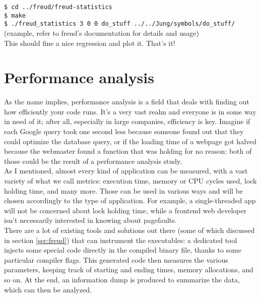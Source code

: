         \texttt{\$ cd ../freud/freud-statistics}\\

        \texttt{\$ make}\\

        \texttt{\$ ./freud\_statistics 3 0 0 do\_stuff ../../Jung/symbols/do\_stuff/}
        (example, refer to freud's documentation for details and usage)\\

        This should fine a nice regression and plot it. That's it!


\chapter{Performance analysis}


    As the name implies, performance analysis is a field that deals with finding out
    how efficiently your code runs. It's a very vast realm and everyone is in some
    way in need of it; after all, especially in large companies, efficiency is key. Imagine if
    each Google query took one second less because someone found out that they could
    optimize the database query, or if the loading time of a webpage got halved because the
    webmaster found a function that was holding for no reason: both of those could be the result
    of a performance analysis study.\\

    As I mentioned, almost every kind of application can be measured, with a vast variety of what we call metrics:
    execution time, memory or CPU cycles used, lock holding time, and many more. Those can be used in
    various ways and will be chosen accordingly to the type of application. For example, a single-threaded app
    will not be concerned about lock holding time, while a frontend web developer isn't 
    necessarily interested in knowing about pagefaults.\\

    There are a lot of existing tools and solutions out there (some of which discussed in section \ref{sec:freud})
    that can instrument the executables: a dedicated tool injects some special code directly in the compiled
    binary file, thanks to some particular compiler flags. This generated code then measures
    the various parameters, keeping track of starting and ending times, memory allocations, and so on.
    At the end, an information dump is produced to summarize the data, which can then be analyzed.


